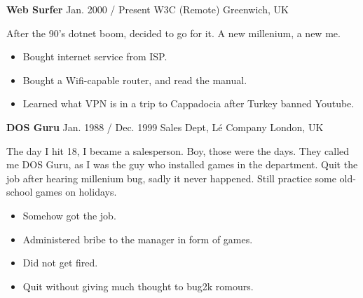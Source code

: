 

    
        \cvItemDocDuo
        {\large \textbf{Web Surfer}}
    	{Jan. 2000 / Present}
    	{W3C}
    	{(Remote) Greenwich, UK}
    	{
    	     After the 90's dotnet boom, decided to go for it. A new millenium, a new me.
                \begin{itemize}
        	        \setlength\itemsep{0em}
                    \item Bought internet service from ISP.
                    \item Bought a Wifi-capable router, and read the manual.
                    \item Learned what VPN is in a trip to Cappadocia after Turkey banned Youtube.
                \end{itemize}
        }
        
        \cvItemDocDuo
    	{\large \textbf{DOS Guru}}
        {Jan. 1988 / Dec. 1999}
        {Sales Dept, L\'{e} Company}
        {London, UK}
        {
            The day I hit 18, I became a salesperson. Boy, those were the days. They called me DOS Guru, as I was the guy who installed games in the department. Quit the job after hearing millenium bug, sadly it never happened. Still practice some old-school games on holidays.
            \par
                \begin{itemize}
        	        \setlength\itemsep{0em}
                    \item Somehow got the job.
                    \item Administered bribe to the manager in form of games.
                    \item Did not get fired.
                    \item Quit without giving much thought to bug2k romours.
                \end{itemize}
    	}
        
